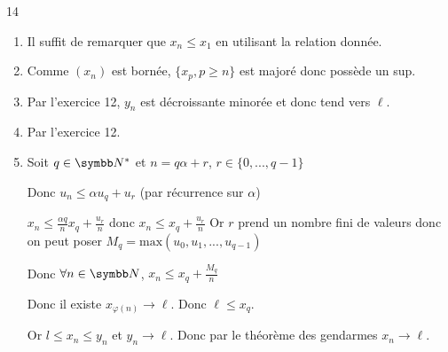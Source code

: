\begin{correction}{14}
\begin{enumerate}
    \item Il suffit de remarquer que $x_n \leqslant x_1$ en utilisant la relation donnée.
    
    \item Comme $(x_n)$ est bornée, $\{x_p, p \geqslant n\}$ est majoré donc possède un sup.

    \item Par l'exercice 12, $y_n$ est décroissante minorée et donc tend vers $\ell$.

    \item Par l'exercice 12.

    \item Soit $ q \in \N^{*}$ et $n = q \alpha + r$, $r \in \{0, ..., q -1\}$

    Donc $u_n \leqslant \alpha u_q + u_r$ (par récurrence sur $\alpha$)

    $x_n \leqslant \frac{\alpha q}n x_q + \frac{u_r}n$ donc $x_n \leqslant x_q + \frac{u_r}n$
    Or $r$ prend un nombre fini de valeurs donc on peut poser $M_q = \text{max}(u_0,u_1,...,u_{q-1})$

    Donc $\forall n \in \N$, $x_n \leqslant x_q + \frac{M_q}n$

    Donc il existe $x_{\varphi(n)} \rightarrow \ell$. Donc $\ell \leqslant x_q$.

    Or $l \leqslant x_n \leqslant y_n$ et $y_n \rightarrow \ell$. Donc par le théorème des gendarmes $x_n \rightarrow \ell$.
\end{enumerate}
\end{correction}
